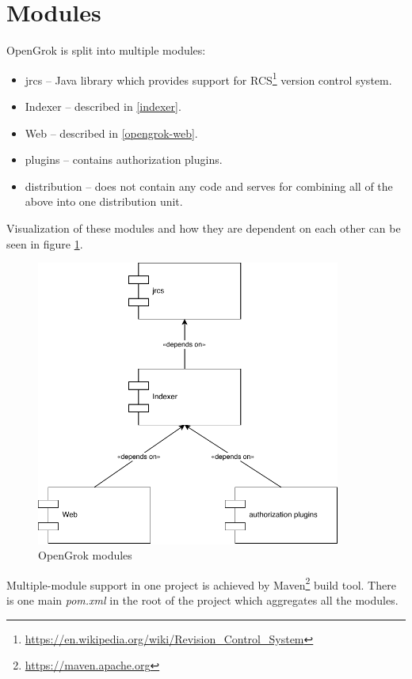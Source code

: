 \section{Modules}
\label{opengrok_modules}

OpenGrok is split into multiple modules:
\begin{itemize}
    \item jrcs – Java library which provides support for RCS\footnote{\url{https://en.wikipedia.org/wiki/Revision\_Control\_System}}
    version control system.
    \item Indexer – described in \ref{indexer}.
    \item Web – described in \ref{opengrok-web}.
    \item plugins – contains authorization plugins.
    \item distribution – does not contain any code and serves for combining all of the above into one distribution unit.
\end{itemize}

Visualization of these modules and how they are dependent on each other can be seen in figure \ref{opengrok_modules_img}.
\begin{figure}[htbp]
\centering
\includegraphics[width=100mm]{../img/opengrok_modules.pdf}
\caption{OpenGrok modules}
\label{opengrok_modules_img}
\end{figure}

Multiple-module support in one project is achieved by Maven\footnote{\url{https://maven.apache.org}} build tool.
There is one main \textit{pom.xml} in the root of the project which aggregates all the modules.


